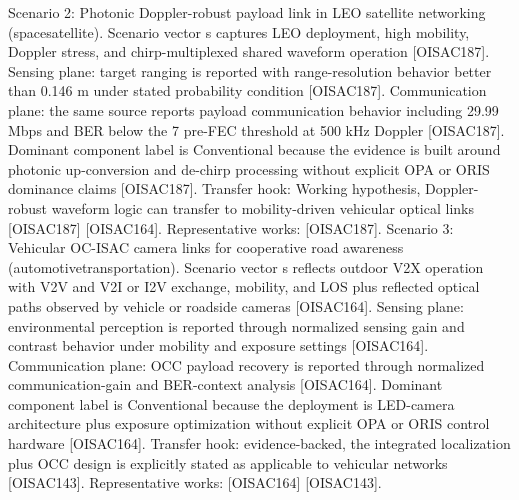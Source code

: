 {}Scenario 2: Photonic Doppler-robust payload link in LEO satellite networking (space\markdownRendererUnderscore{}satellite).\markdownRendererHardLineBreak
{}Scenario vector s captures LEO deployment, high mobility, Doppler stress, and chirp-multiplexed shared waveform operation [O\markdownRendererUnderscore{}ISAC\markdownRendererUnderscore{}187]. Sensing plane: target ranging is reported with range-resolution behavior better than 0.146 m under stated probability condition [O\markdownRendererUnderscore{}ISAC\markdownRendererUnderscore{}187]. Communication plane: the same source reports payload communication behavior including 29.99 Mbps and BER below the 7\markdownRendererPercentSign{} pre-FEC threshold at 500 kHz Doppler [O\markdownRendererUnderscore{}ISAC\markdownRendererUnderscore{}187]. Dominant component label is Conventional because the evidence is built around photonic up-conversion and de-chirp processing without explicit OPA or ORIS dominance claims [O\markdownRendererUnderscore{}ISAC\markdownRendererUnderscore{}187]. Transfer hook: Working hypothesis, Doppler-robust waveform logic can transfer to mobility-driven vehicular optical links [O\markdownRendererUnderscore{}ISAC\markdownRendererUnderscore{}187] [O\markdownRendererUnderscore{}ISAC\markdownRendererUnderscore{}164]. Representative works: [O\markdownRendererUnderscore{}ISAC\markdownRendererUnderscore{}187].\markdownRendererInterblockSeparator
{}
\markdownRendererSectionEnd \markdownRendererSectionBegin
{}\markdownRendererInterblockSeparator
{}Scenario 3: Vehicular OC-ISAC camera links for cooperative road awareness (automotive\markdownRendererUnderscore{}transportation).\markdownRendererHardLineBreak
{}Scenario vector s reflects outdoor V2X operation with V2V and V2I or I2V exchange, mobility, and LOS plus reflected optical paths observed by vehicle or roadside cameras [O\markdownRendererUnderscore{}ISAC\markdownRendererUnderscore{}164]. Sensing plane: environmental perception is reported through normalized sensing gain and contrast behavior under mobility and exposure settings [O\markdownRendererUnderscore{}ISAC\markdownRendererUnderscore{}164]. Communication plane: OCC payload recovery is reported through normalized communication-gain and BER-context analysis [O\markdownRendererUnderscore{}ISAC\markdownRendererUnderscore{}164]. Dominant component label is Conventional because the deployment is LED-camera architecture plus exposure optimization without explicit OPA or ORIS control hardware [O\markdownRendererUnderscore{}ISAC\markdownRendererUnderscore{}164]. Transfer hook: evidence-backed, the integrated localization plus OCC design is explicitly stated as applicable to vehicular networks [O\markdownRendererUnderscore{}ISAC\markdownRendererUnderscore{}143]. Representative works: [O\markdownRendererUnderscore{}ISAC\markdownRendererUnderscore{}164] [O\markdownRendererUnderscore{}ISAC\markdownRendererUnderscore{}143].\markdownRendererParagraphSeparator
